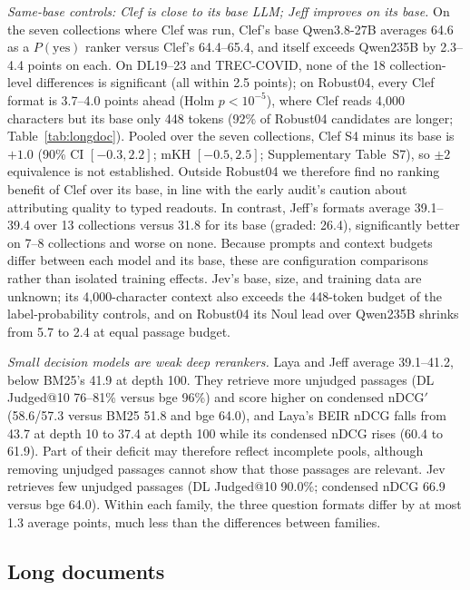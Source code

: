 \emph{Same-base controls: Clef is close to its base LLM; Jeff improves on its base.} On the seven collections where Clef was run, Clef's base Qwen3.8-27B averages 64.6 as a $P(\text{yes})$ ranker versus Clef's 64.4--65.4, and itself exceeds Qwen235B by 2.3--4.4 points on each. On DL19--23 and TREC-COVID, none of the 18 collection-level differences is significant (all within 2.5 points); on Robust04, every Clef format is 3.7--4.0 points ahead (Holm $p<10^{-5}$), where Clef reads 4{,}000 characters but its base only 448 tokens (92\% of Robust04 candidates are longer; Table~\ref{tab:longdoc}). Pooled over the seven collections, Clef S4 minus its base is $+1.0$ (90\% CI $[-0.3,2.2]$; mKH $[-0.5,2.5]$; Supplementary Table~S7), so $\pm2$ equivalence is not established. Outside Robust04 we therefore find no ranking benefit of Clef over its base, in line with the early audit's caution about attributing quality to typed readouts\cite{tang2026tdmaudit}. In contrast, Jeff's formats average 39.1--39.4 over 13 collections versus 31.8 for its base (graded: 26.4), significantly better on 7--8 collections and worse on none. Because prompts and context budgets differ between each model and its base, these are configuration comparisons rather than isolated training effects. Jev's base, size, and training data are unknown; its 4{,}000-character context also exceeds the 448-token budget of the label-probability controls, and on Robust04 its Noul lead over Qwen235B shrinks from 5.7 to 2.4 at equal passage budget.

\emph{Small decision models are weak deep rerankers.} Laya and Jeff average 39.1--41.2, below BM25's 41.9 at depth 100. They retrieve more unjudged passages (DL Judged@10 76--81\% versus bge 96\%) and score higher on condensed nDCG$'$ (58.6/57.3 versus BM25 51.8 and bge 64.0), and Laya's BEIR nDCG falls from 43.7 at depth 10 to 37.4 at depth 100 while its condensed nDCG rises (60.4 to 61.9). Part of their deficit may therefore reflect incomplete pools, although removing unjudged passages cannot show that those passages are relevant. Jev retrieves few unjudged passages (DL Judged@10 90.0\%; condensed nDCG 66.9 versus bge 64.0).
Within each family, the three question formats differ by at most 1.3 average points, much less than the differences between families.



\subsection{Long documents}

